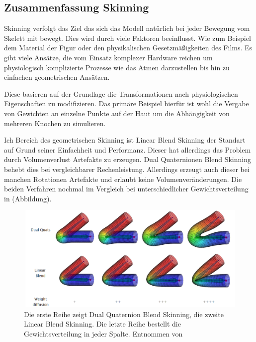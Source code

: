 \subsection{Zusammenfassung Skinning}

Skinning verfolgt das Ziel das sich das Modell natürlich bei jeder Bewegung vom Skelett mit bewegt. Dies wird durch viele Faktoren beeinflusst. Wie zum Beispiel dem Material der Figur oder den physikalischen Gesetzmäßigkeiten des Films. Es gibt viele Ansätze, die vom Einsatz komplexer Hardware reichen um physiologisch komplizierte Prozesse wie das Atmen darzustellen bis hin zu einfachen geometrischen Ansätzen. 

Diese basieren auf der Grundlage die Transformationen nach physiologischen Eigenschaften zu modifizieren. Das primäre Beispiel hierfür ist wohl die Vergabe von Gewichten an einzelne Punkte auf der Haut um die Abhängigkeit von mehreren Knochen zu simulieren. 

Ich Bereich des geometrischen Skinning ist Linear Blend Skinning der Standart auf Grund seiner Einfachheit und Performanz. Dieser hat allerdings das Problem durch Volumenverlust Artefakte zu erzeugen. Dual Quaternionen Blend Skinning behebt dies bei vergleichbarer Rechenleistung. Allerdings erzeugt auch dieser bei manchen Rotationen Artefakte und erlaubt keine Volumenveränderungen. Die beiden Verfahren nochmal im Vergleich bei unterschiedlicher Gewichtsverteilung in (Abbildung).

\begin{figure}[t]
	\includegraphics[width=13cm]{01_Skinning/pics/lbsvsdqs.png}
	\caption[Geometrisches Skinning im Vergleich]{Die erste Reihe zeigt Dual Quaternion Blend Skinning, die zweite Linear Blend Skinning. Die letzte Reihe bestellt die Gewichtsverteilung in jeder Spalte. Entnommen von}
	\label{weights_fig1}
\end{figure}